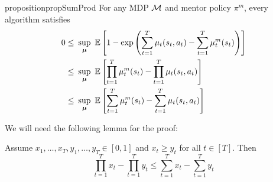 \begin{restatable}{proposition}{propSumProd}
\label{prop:sum-prod}
For any MDP $\mathcal{M}$ and mentor policy $\pi^m$, every algorithm satisfies
\begin{align*}
0 \le&\ \sup_{\bfmu}\ \E\left[1-\exp \left(\sum_{t=1}^T \mu_t(s_t,a_t) -\sum_{t=1}^T \mu_t^m(s_t) \right)\right]\\ \le&\ \sup_{\bfmu}\  \E\left[\prod_{t=1}^T \mu_t^m(s_t) - \prod_{t=1}^T \mu_t(s_t, a_t)\right]\\
\le&\ \sup_{\bfmu}\ \E \left[\sum_{t=1}^T \mu_t^m(s_t) - \sum_{t=1}^T \mu_t(s_t, a_t)\right]
\end{align*}
\end{restatable}


We will need the following lemma for the proof:


\begin{lemma}
\label{lem:pos-prod-bound}
Assume $x_1,\dots,x_T, y_1,\dots,y_T \in [0,1]$ and $x_t \ge y_t$ for all $t \in [T]$. Then
\[
\prod_{t=1}^T x_t - \prod_{t=1}^T y_t \le \sum_{t=1}^T x_t - \sum_{t=1}^T y_t
\]
\end{lemma}


